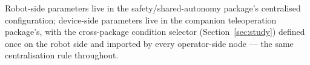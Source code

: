 \documentclass[12pt,a4paper,twoside,openright]{report}
\begin{document}
\endgroup

Robot-side parameters live in the safety/shared-autonomy package's centralised configuration; device-side parameters live in the companion teleoperation package's, with the cross-package condition selector (Section~\ref{sec:study}) defined once on the robot side and imported by every operator-side node --- the same centralisation rule throughout.



\end{document}
